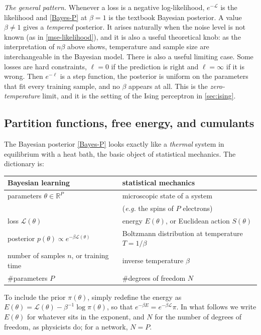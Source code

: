 \documentclass[11pt]{article}
\newcommand{\R}{\mathbb{R}}
\newcommand{\CL}{{\mathcal L}}
\begin{document}
\emph{The general pattern.} Whenever a loss is a negative log-likelihood, $e^{-\CL}$ is the likelihood and \eqref{Bayes-P} at $\beta=1$ is the textbook Bayesian posterior. A value $\beta\neq 1$ gives a \emph{tempered} posterior. It arises naturally when the noise level is not known (as in \eqref{mse-likelihood}), and it is also a useful theoretical knob: as the interpretation of $n\beta$ above shows, temperature and sample size are interchangeable in the Bayesian model. There is also a useful limiting case. Some losses are hard constraints, $\ell = 0$ if the prediction is right and $\ell=\infty$ if it is wrong. Then $e^{-\ell}$ is a step function, the posterior is uniform on the parameters that fit every training sample, and no $\beta$ appears at all. This is the \emph{zero-temperature} limit, and it is the setting of the Ising perceptron in \cref{sec:ising}.

\subsection{Partition functions, free energy, and cumulants}
\label{sec:dictionary}

The Bayesian posterior \eqref{Bayes-P} looks exactly like a \emph{thermal} system in equilibrium with a heat bath, the basic object of statistical mechanics. The dictionary is:
%
\begin{center}
\small
\renewcommand{\arraystretch}{1.3}
\begin{tabular}{l|l}
    \textbf{Bayesian learning} & \textbf{statistical mechanics} \\\hline
    parameters $\theta\in\R^P$ & microscopic state of a system \\
    & (\emph{e.g.} the spins of $P$ electrons) \\
    loss $\CL(\theta)$ & energy $E(\theta)$, or Euclidean action $S(\theta)$ \\
    posterior $p(\theta)\propto e^{-\beta\CL(\theta)}$ & Boltzmann distribution at temperature $T=1/\beta$ \\
    number of samples $n$, or training time & inverse temperature $\beta$ \\
    \#parameters $P$ & \#degrees of freedom $N$
\end{tabular}
\end{center}
%
To include the prior $\pi(\theta)$, simply redefine the energy as $E(\theta) = \CL(\theta) - \beta^{-1}\log\pi(\theta)$, so that $e^{-\beta E} = e^{-\beta\CL}\pi$. In what follows we write $E(\theta)$ for whatever sits in the exponent, and $N$ for the number of degrees of freedom, as physicists do; for a network, $N=P$.
\end{document}
